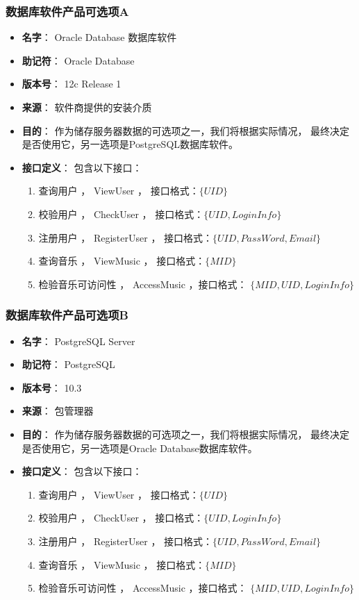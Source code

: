 \subsubsection{数据库软件产品可选项A} %
\begin{itemize}
	\item \textbf{名字}：
		Oracle Database 数据库软件
	\item \textbf{助记符}：
		Oracle Database
	\item \textbf{版本号}：
		12c Release 1
	\item \textbf{来源}：
		软件商提供的安装介质
	\item \textbf{目的}：
		作为储存服务器数据的可选项之一，我们将根据实际情况，
			最终决定是否使用它，另一选项是PostgreSQL数据库软件。
	\item \textbf{接口定义}：
		包含以下接口：
		\begin{enumerate}
			\item 查询用户 ， ViewUser   ， 接口格式：$\{ UID \}$
			\item 校验用户 ， CheckUser  ， 接口格式：$\{ UID, LoginInfo \}$
			\item 注册用户 ， RegisterUser  ， 接口格式：$\{ UID,  PassWord, Email\}$
			\item 查询音乐 ， ViewMusic  ， 接口格式：$\{ MID \}$
			\item 检验音乐可访问性 ， AccessMusic ，接口格式： $\{ MID, UID, LoginInfo \}$ 
		\end{enumerate}
\end{itemize}

\subsubsection{数据库软件产品可选项B} %
\begin{itemize}
	\item \textbf{名字}：
		PostgreSQL Server
	\item \textbf{助记符}：
		PostgreSQL
	\item \textbf{版本号}：
		10.3
	\item \textbf{来源}：
		包管理器
	\item \textbf{目的}：
		作为储存服务器数据的可选项之一，我们将根据实际情况，
			最终决定是否使用它，另一选项是Oracle Database数据库软件。
	\item \textbf{接口定义}：
		包含以下接口：
		\begin{enumerate}
			\item 查询用户 ， ViewUser   ， 接口格式：$\{ UID \}$
			\item 校验用户 ， CheckUser  ， 接口格式：$\{ UID, LoginInfo \}$
			\item 注册用户 ， RegisterUser  ， 接口格式：$\{ UID,  PassWord, Email\}$
			\item 查询音乐 ， ViewMusic  ， 接口格式：$\{ MID \}$
			\item 检验音乐可访问性 ， AccessMusic ，接口格式： $\{ MID, UID, LoginInfo \}$ 
		\end{enumerate}
\end{itemize}

